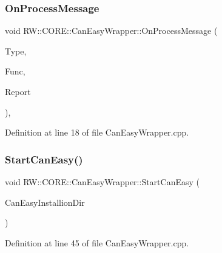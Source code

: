 \subsubsection{\texorpdfstring{On\+Process\+Message}{OnProcessMessage}}
{\footnotesize\ttfamily void R\+W\+::\+C\+O\+R\+E\+::\+Can\+Easy\+Wrapper\+::\+On\+Process\+Message (\begin{DoxyParamCaption}\item[{Util\+::\+Message\+Receiver}]{Type,  }\item[{Util\+::\+Functions}]{Func,  }\item[{Q\+Byte\+Array}]{Report }\end{DoxyParamCaption})\hspace{0.3cm}{\ttfamily [virtual]}, {\ttfamily [slot]}}



Definition at line 18 of file Can\+Easy\+Wrapper.\+cpp.

\hypertarget{class_r_w_1_1_c_o_r_e_1_1_can_easy_wrapper_a3dd585f435f8249429a1cd6c60f52037}{}\label{class_r_w_1_1_c_o_r_e_1_1_can_easy_wrapper_a3dd585f435f8249429a1cd6c60f52037} 
\subsubsection{\texorpdfstring{Start\+Can\+Easy()}{StartCanEasy()}}
{\footnotesize\ttfamily void R\+W\+::\+C\+O\+R\+E\+::\+Can\+Easy\+Wrapper\+::\+Start\+Can\+Easy (\begin{DoxyParamCaption}\item[{const Q\+File \&}]{Can\+Easy\+Installion\+Dir }\end{DoxyParamCaption})\hspace{0.3cm}{\ttfamily [private]}}



Definition at line 45 of file Can\+Easy\+Wrapper.\+cpp.

\hypertarget{class_r_w_1_1_c_o_r_e_1_1_can_easy_wrapper_ad0bab30da2a3b67c624b82c0696d0d22}{}\label{class_r_w_1_1_c_o_r_e_1_1_can_easy_wrapper_ad0bab30da2a3b67c624b82c0696d0d22} 
